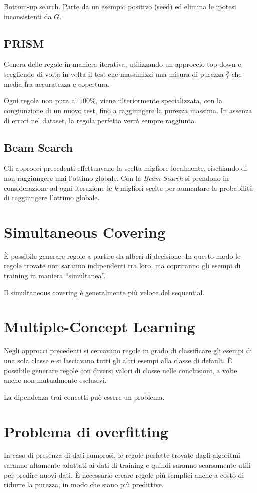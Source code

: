 \documentclass[11pt,onecolumn,a4paper,oneside]{book}
\begin{document}
	Bottom-up search. Parte da un esempio positivo (seed) ed elimina le ipotesi inconsistenti da $G$.
	
	\subsection{PRISM}
	Genera delle regole in maniera iterativa, utilizzando un approccio top-down e scegliendo di volta in volta il test che massimizzi una misura di purezza $\frac{p}{t}$ che media fra accuratezza e copertura.
	
	Ogni regola non pura al $100\%$, viene ulteriormente specializzata, con la congiunzione di un nuovo test, fino a raggiungere la purezza massima. In assenza di errori nel dataset, la regola perfetta verrà sempre raggiunta.

	\subsection{Beam Search}
	Gli approcci precedenti effettuavano la scelta migliore localmente, rischiando di non raggiungere mai l'ottimo globale.
	Con la \emph{Beam Search} si prendono in considerazione ad ogni iterazione le $k$ migliori scelte per aumentare la probabilità di raggiungere l'ottimo globale.

	\section{Simultaneous Covering}
È possibile generare regole a partire da alberi di decisione.
In questo modo le regole trovate non saranno indipendenti tra loro, ma copriranno gli esempi di training in maniera ``simultanea''.

Il simultaneous covering è generalmente più veloce del sequential.

	\section{Multiple-Concept Learning}
	Negli approcci precedenti si cercavano regole in grado di classificare gli esempi di una sola classe e si lasciavano tutti gli altri esempi alla classe di default.
	È possibile generare regole con diversi valori di classe nelle conclusioni, a volte anche non mutualmente esclusivi.
	
	La dipendenza trai concetti può essere un problema.
	
	
	\section{Problema di overfitting}
	In caso di presenza di dati rumorosi, le regole perfette trovate dagli algoritmi saranno altamente adattati ai dati di training e quindi saranno scarsamente utili per predire nuovi dati.
	È necessario creare regole più semplici anche a costo di ridurre la purezza, in modo che siano più predittive.
	
\end{document}
